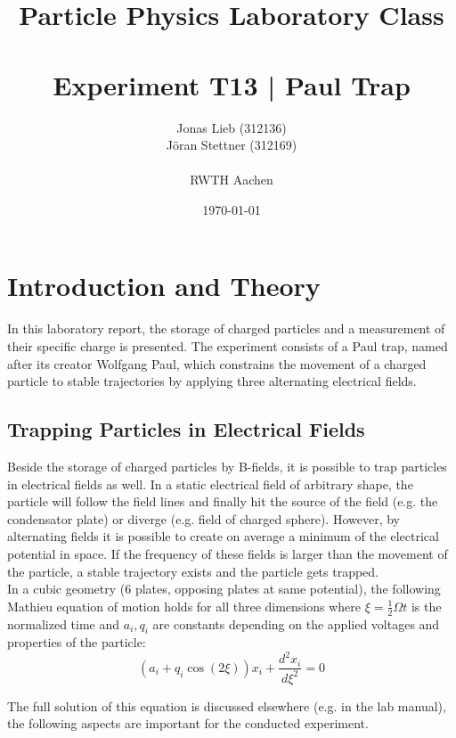 \documentclass[
	paper=A4,
	parskip=full,
	chapterprefix=true,
	11pt,
	headings=normal,
	bibliography=totoc,
	listof=totoc,
	titlepage=on,
]{scrreprt}
\date{\today}
\title{Particle Physics Laboratory Class \\ \quad \\ Experiment T13 | Paul Trap }
\author{Jonas Lieb (312136) \\ Jöran Stettner (312169) \\ \\  RWTH Aachen}
\begin{document}
\maketitle

\cleardoublepage

\setcounter{tocdepth}{2}
\tableofcontents

\cleardoublepage

\chapter{Introduction and Theory}

In this laboratory report, the storage of charged particles and a measurement of their specific charge is presented. The experiment consists of a Paul trap, named after its creator Wolfgang Paul, which constrains the movement of a charged particle to stable trajectories by applying three alternating electrical fields. 

\section{Trapping Particles in Electrical Fields}

Beside the storage of charged particles by B-fields, it is possible to trap particles in electrical fields as well. In a static electrical field of arbitrary shape, the particle will follow the field lines and finally hit the source of the field (e.g. the condensator plate) or diverge (e.g. field of charged sphere). However, by alternating fields it is possible to create on average a minimum of the electrical potential in space. If the frequency of these fields is larger than the movement of the particle, a stable trajectory exists and the particle gets trapped. \\

In a cubic geometry (6 plates, opposing plates at same potential), the following Mathieu equation of motion holds for all three dimensions where $\xi = \frac{1}{2} \Omega t$ is the normalized time and $a_i, q_i$ are constants depending on the applied voltages and properties of the particle:
\begin{equation}
\label{eq:mathieu}
\left(a_i+q_i \cos(2 \xi)\right) x_i + \frac{d^2x_i}{d\xi^2} = 0
\end{equation}

The full solution of this equation is discussed elsewhere (e.g. in the lab manual\cite{Lab_manual}), the following aspects are important for the conducted experiment.
\end{document}

